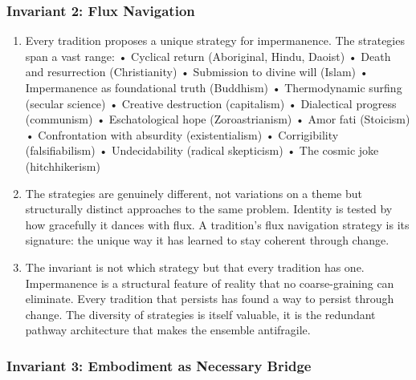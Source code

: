 \documentclass[
]{article}
\begin{document}
\subsubsection{Invariant 2: Flux
Navigation}\label{invariant-2-flux-navigation}

\begin{enumerate}
\def\labelenumi{\arabic{enumi}.}
\setcounter{enumi}{166}
\item
  Every tradition proposes a unique strategy for impermanence. The
  strategies span a vast range: • Cyclical return (Aboriginal, Hindu,
  Daoist) • Death and resurrection (Christianity) • Submission to divine
  will (Islam) • Impermanence as foundational truth (Buddhism) •
  Thermodynamic surfing (secular science) • Creative destruction
  (capitalism) • Dialectical progress (communism) • Eschatological hope
  (Zoroastrianism) • Amor fati (Stoicism) • Confrontation with absurdity
  (existentialism) • Corrigibility (falsifiabilism) • Undecidability
  (radical skepticism) • The cosmic joke (hitchhikerism)
\item
  The strategies are genuinely different, not variations on a theme but
  structurally distinct approaches to the same problem. Identity is
  tested by how gracefully it dances with flux. A tradition's flux
  navigation strategy is its signature: the unique way it has learned to
  stay coherent through change.
\item
  The invariant is not which strategy but that every tradition has one.
  Impermanence is a structural feature of reality that no
  coarse-graining can eliminate. Every tradition that persists has found
  a way to persist through change. The diversity of strategies is itself
  valuable, it is the redundant pathway architecture that makes the
  ensemble antifragile.
\end{enumerate}

\subsubsection{Invariant 3: Embodiment as Necessary
Bridge}\label{invariant-3-embodiment-as-necessary-bridge}
\end{document}
